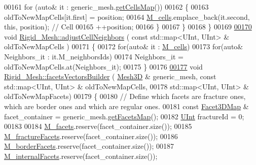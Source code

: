 \begin{DoxyCode}
00161         \textcolor{keywordflow}{for} (\textcolor{keyword}{auto}& it : generic\_mesh.\hyperlink{classFVCode3D_1_1Mesh3D_ad904ef5e068c89951d77e9364e960bf3}{getCellsMap}())
00162         \{
00163             oldToNewMapCells[it.first] = position;
00164             \hyperlink{classFVCode3D_1_1Rigid__Mesh_ad19dc70b4efddafb6e8d8d4980bd23d6}{M\_cells}.emplace\_back(it.second, \textcolor{keyword}{this}, position); \textcolor{comment}{// Cell}
00165             ++position;
00166         \}
00167     \}
00168 \}
00169 
\hypertarget{RigidMesh_8cpp_source.tex_l00170}{}\hyperlink{classFVCode3D_1_1Rigid__Mesh_a137e1a9da5d7fadfac8053c15ff4749b}{00170} \textcolor{keywordtype}{void} \hyperlink{classFVCode3D_1_1Rigid__Mesh_a137e1a9da5d7fadfac8053c15ff4749b}{Rigid\_Mesh::adjustCellNeighbors} ( \textcolor{keyword}{const} std::map<UInt, UInt> & 
      oldToNewMapCells )
00171 \{
00172     \textcolor{keywordflow}{for}(\textcolor{keyword}{auto}& it : \hyperlink{classFVCode3D_1_1Rigid__Mesh_ad19dc70b4efddafb6e8d8d4980bd23d6}{M\_cells})
00173         \textcolor{keywordflow}{for}(\textcolor{keyword}{auto}& Neighbors\_it : it.M\_neighborsIds)
00174             Neighbors\_it = oldToNewMapCells.at(Neighbors\_it);
00175 \}
00176 
\hypertarget{RigidMesh_8cpp_source.tex_l00177}{}\hyperlink{classFVCode3D_1_1Rigid__Mesh_aa425c5b71169c77ee04ad9fe3ebf9123}{00177} \textcolor{keywordtype}{void} \hyperlink{classFVCode3D_1_1Rigid__Mesh_aa425c5b71169c77ee04ad9fe3ebf9123}{Rigid\_Mesh::facetsVectorsBuilder} ( \hyperlink{classFVCode3D_1_1Mesh3D}{Mesh3D} & generic\_mesh, \textcolor{keyword}{const} 
      std::map<UInt, UInt> & oldToNewMapCells,
00178     std::map<UInt, UInt> & oldToNewMapFacets)
00179 \{
00180     \textcolor{comment}{// Define which facets are fracture ones, which are border ones and which are regular ones.}
00181     \textcolor{keyword}{const} \hyperlink{classFVCode3D_1_1Rigid__Mesh_ae579d78d6aa68fb20068061a01c71225}{Facet3DMap} & facet\_container = generic\_mesh.\hyperlink{classFVCode3D_1_1Mesh3D_a76de387da2a552e3e1210d795bc7acf9}{getFacetsMap}();
00182     \hyperlink{namespaceFVCode3D_a4bf7e328c75d0fd504050d040ebe9eda}{UInt} fractureId = 0;
00183 
00184     \hyperlink{classFVCode3D_1_1Rigid__Mesh_a62757eb1d9c54b4421880b3c271b4c3b}{M\_facets}.reserve(facet\_container.size());
00185     \hyperlink{classFVCode3D_1_1Rigid__Mesh_acaff9da1f03f04f7012cf372f8f27cd6}{M\_fractureFacets}.reserve(facet\_container.size());
00186     \hyperlink{classFVCode3D_1_1Rigid__Mesh_a21700f8c7b816da944a829ee9d3ab7fb}{M\_borderFacets}.reserve(facet\_container.size());
00187     \hyperlink{classFVCode3D_1_1Rigid__Mesh_a8ede7966973fec708327b95fc379a4e1}{M\_internalFacets}.reserve(facet\_container.size());

\end{DoxyCode}
